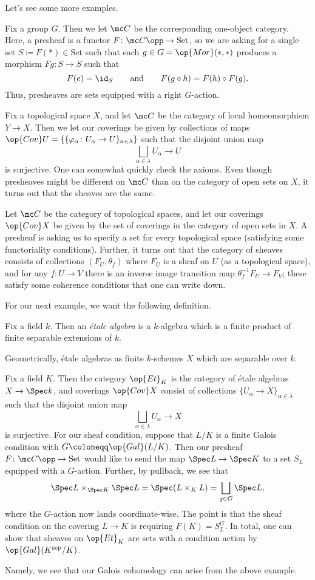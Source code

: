 \documentclass[../notes.tex]{subfiles}
\begin{document}
Let's see some more examples.
\begin{example}
	Fix a group $G$. Then we let $\mc C$ be the corresponding one-object category. Here, a presheaf is a functor $F\colon\mc C\opp\to\mathrm{Set}$, so we are asking for a single set $S\coloneqq F(*)\in\mathrm{Set}$ such that each $g\in G=\op{Mor}(*,*)$ produces a morphism $Fg\colon S\to S$ such that
	\[F(e)=\id_S\qquad\text{and}\qquad F(g\circ h)=F(h)\circ F(g).\]
	Thus, presheaves are sets equipped with a right $G$-action.
\end{example}
\begin{example}
	Fix a topological space $X$, and let $\mc C$ be the category of local homeomorphism $Y\to X$. Then we let our coverings be given by collections of maps $\op{Cov}U=\{\{\varphi_\alpha\colon U_\alpha\to U\}_{\alpha\in\lambda}\}$ such that the disjoint union map
	\[\bigsqcup_{\alpha\in\lambda}U_\alpha\to U\]
	is surjective. One can somewhat quickly check the axioms. Even though presheaves might be different on $\mc C$ than on the category of open sets on $X$, it turns out that the sheaves are the same.
\end{example}
\begin{example}
	Let $\mc C$ be the category of topological spaces, and let our coverings $\op{Cov}X$ be given by the set of coverings in the category of open sets in $X$. A presheaf is asking us to specify a set for every topological space (satisfying some functoriality conditions). Further, it turns out that the category of sheaves consists of collections $(F_U,\theta_f)$ where $F_U$ is a sheaf on $U$ (as a topological space), and for any $f\colon U\to V$ there is an inverse image transition map $\theta_f^{-1}F_U\to F_V$; these satisfy some coherence conditions that one can write down.
\end{example}
For our next example, we want the following definition.
\begin{definition}
	Fix a field $k$. Then an \textit{\'etale algebra} is a $k$-algebra which is a finite product of finite separable extensions of $k$.
\end{definition}
Geometrically, \'etale algebras as finite $k$-schemes $X$ which are separable over $k$.
\begin{example}
	Fix a field $K$. Then the category $\op{Et}_K$ is the category of \'etale algebras $X\to\Spec k$, and coverings $\op{Cov}X$ consist of collections $\{U_\alpha\to X\}_{\alpha\in\lambda}$ such that the disjoint union map
	\[\bigsqcup_{\alpha\in\lambda}U_\alpha\to X\]
	is surjective. For our sheaf condition, suppose that $L/K$ is a finite Galois condition with $G\coloneqq\op{Gal}(L/K)$. Then our presheaf $F\colon\mc C\opp\to\mathrm{Set}$ would like to send the map $\Spec L\to\Spec K$ to a set $S_L$ equipped with a $G$-action. Further, by pullback, we see that
	\[\Spec L\times_{\Spec K}\Spec L=\Spec (L\times_KL)=\bigsqcup_{g\in G}\Spec L,\]
	where the $G$-action now lands coordinate-wise. The point is that the sheaf condition on the covering $L\to K$ is requiring $F(K)=S_L^G$. In total, one can show that sheaves on $\op{Et}_K$ are sets with a condition action by $\op{Gal}(K^{\mathrm{sep}}/K)$.
\end{example}
Namely, we see that our Galois cohomology can arise from the above example.
\end{document}
